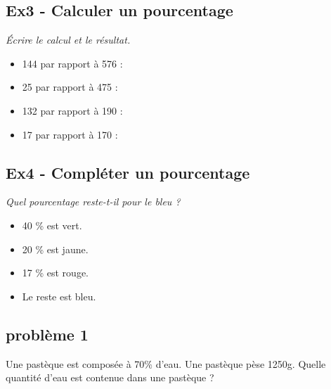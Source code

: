 \subsection*{Ex3 - Calculer un pourcentage}

\textit{Écrire le calcul et le résultat.}
  
\begin{multicols}{2}
  \begin{itemize}[label={$\bullet$}]
    \item 144 par rapport à 576 : \dotfill \\ \Pointilles[1]
    \item 25 par rapport à 475 : \dotfill \\ \Pointilles[1] \columnbreak 
    \item 132 par rapport à 190 : \dotfill \\ \Pointilles[1]
    \item 17 par rapport à 170 : \dotfill \\ \Pointilles[1]
  \end{itemize} 
\end{multicols}

\subsection*{Ex4 - Compléter un pourcentage}

\textit{Quel pourcentage reste-t-il pour le bleu ?}

\begin{multicols}{2}
\begin{itemize}[label={$\bullet$}]
  \item 40 \% est vert.
  \item 20 \% est jaune.
  \item 17 \% est rouge.
  \item Le reste est bleu. 
\end{itemize} \columnbreak 
\Pointilles[6]
\end{multicols}

\newpage

\subsection*{problème 1}

Une pastèque est composée à 70\% d'eau. Une pastèque pèse 1250g. Quelle quantité d'eau est contenue dans une pastèque ? \\

\Pointilles[4]

